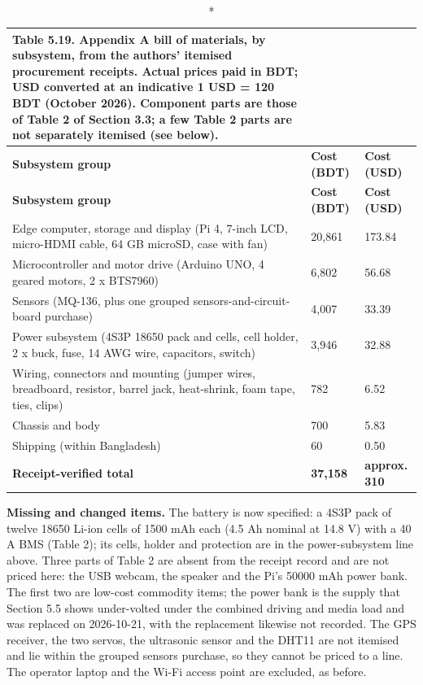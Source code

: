 \begin{center}
\begin{longtable}{|p{8cm}|l|l|}
\caption*{Table 5.19. Appendix A bill of materials, by subsystem, from the authors' itemised procurement receipts. Actual prices paid in BDT; USD converted at an indicative 1 USD = 120 BDT (October 2026). Component parts are those of Table 2 of Section 3.3; a few Table 2 parts are not separately itemised (see below).}
\addcontentsline{lot}{table}{\protect\numberline{5.19}Appendix A bill of materials, by subsystem, from the authors' itemised procurement receipts. Actual prices paid in BDT; USD converted at an indicative 1 USD = 120 BDT (October 2026). Component parts are those of Table 2 of Section 3.3; a few Table 2 parts are not separately itemised (see below).}
\\
\hline
\textbf{Subsystem group} & \textbf{Cost (BDT)} & \textbf{Cost (USD)} \\
\hline
\endfirsthead
\hline
\textbf{Subsystem group} & \textbf{Cost (BDT)} & \textbf{Cost (USD)} \\
\hline
\endhead
Edge computer, storage and display (Pi 4, 7-inch LCD, micro-HDMI cable, 64 GB microSD, case with fan) & 20,861 & 173.84 \\
\hline
Microcontroller and motor drive (Arduino UNO, 4 geared motors, 2 x BTS7960) & 6,802 & 56.68 \\
\hline
Sensors (MQ-136, plus one grouped sensors-and-circuit-board purchase) & 4,007 & 33.39 \\
\hline
Power subsystem (4S3P 18650 pack and cells, cell holder, 2 x buck, fuse, 14 AWG wire, capacitors, switch) & 3,946 & 32.88 \\
\hline
Wiring, connectors and mounting (jumper wires, breadboard, resistor, barrel jack, heat-shrink, foam tape, ties, clips) & 782 & 6.52 \\
\hline
Chassis and body & 700 & 5.83 \\
\hline
Shipping (within Bangladesh) & 60 & 0.50 \\
\hline
\textbf{Receipt-verified total} & \textbf{37,158} & \textbf{approx. 310} \\
\hline
\end{longtable}
\end{center}

\textbf{Missing and changed items.} The battery is now specified: a 4S3P pack of twelve 18650 Li-ion cells of 1500 mAh each (4.5 Ah nominal at 14.8 V) with a 40 A BMS (Table 2); its cells, holder and protection are in the power-subsystem line above. Three parts of Table 2 are absent from the receipt record and are not priced here: the USB webcam, the speaker and the Pi's 50000 mAh power bank. The first two are low-cost commodity items; the power bank is the supply that Section 5.5 shows under-volted under the combined driving and media load and was replaced on 2026-10-21, with the replacement likewise not recorded. The GPS receiver, the two servos, the ultrasonic sensor and the DHT11 are not itemised and lie within the grouped sensors purchase, so they cannot be priced to a line. The operator laptop and the Wi-Fi access point are excluded, as before.

